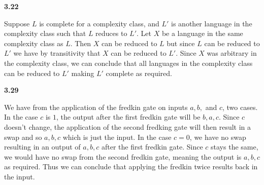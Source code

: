 \textbf{3.22}

Suppose $L$ is complete for a complexity class, and $L'$ is another language in the complexity class such that $L$ reduces to $L'$. Let $X$ be a language in the same complexity class as $L$. Then $X$ can be reduced to $L$ but since $L$ can be reduced to $L'$ we have by transitivity that $X$ can be reduced to $L'$. Since $X$ was arbitrary in the complexity class, we can conclude that all languages in the complexity class can be reduced to $L'$ making $L'$ complete as required.

\textbf{3.29}

We have from the application of the fredkin gate on inputs $a,b,$ and $c$, two cases. In the case $c$ is $1$, the output after the first fredkin gate will be $b,a,c$. Since $c$ doesn't change, the application of the second fredking gate will then result in a swap and so $a,b,c$ which is just the input. In the case $c = 0$, we have no swap resulting in an output of $a,b,c$ after the first fredkin gate. Since $c$ stays the same, we would have no swap from the second fredkin gate, meaning the output is $a,b,c$ as required. Thus we can conclude that applying the fredkin twice results back in the input. 

 

